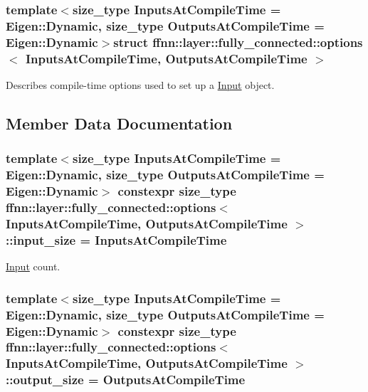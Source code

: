 \subsubsection*{template$<$size\-\_\-type Inputs\-At\-Compile\-Time = Eigen\-::\-Dynamic, size\-\_\-type Outputs\-At\-Compile\-Time = Eigen\-::\-Dynamic$>$struct ffnn\-::layer\-::fully\-\_\-connected\-::options$<$ Inputs\-At\-Compile\-Time, Outputs\-At\-Compile\-Time $>$}

Describes compile-\/time options used to set up a \hyperlink{classffnn_1_1layer_1_1_input}{Input} object. 

\subsection{Member Data Documentation}
\hypertarget{structffnn_1_1layer_1_1fully__connected_1_1options_ae136ed9ebf9016f397acc9f3c10c9a32}{
\subsubsection[{input\-\_\-size}]{\setlength{\rightskip}{0pt plus 5cm}template$<$size\-\_\-type Inputs\-At\-Compile\-Time = Eigen\-::\-Dynamic, size\-\_\-type Outputs\-At\-Compile\-Time = Eigen\-::\-Dynamic$>$ constexpr {\bf size\-\_\-type} {\bf ffnn\-::layer\-::fully\-\_\-connected\-::options}$<$ Inputs\-At\-Compile\-Time, Outputs\-At\-Compile\-Time $>$\-::input\-\_\-size = Inputs\-At\-Compile\-Time\hspace{0.3cm}{\ttfamily [static]}}}\label{structffnn_1_1layer_1_1fully__connected_1_1options_ae136ed9ebf9016f397acc9f3c10c9a32}


\hyperlink{classffnn_1_1layer_1_1_input}{Input} count. 

\hypertarget{structffnn_1_1layer_1_1fully__connected_1_1options_a7b40e94c99dc865af66d8f2ee5a8c4cc}{
\subsubsection[{output\-\_\-size}]{\setlength{\rightskip}{0pt plus 5cm}template$<$size\-\_\-type Inputs\-At\-Compile\-Time = Eigen\-::\-Dynamic, size\-\_\-type Outputs\-At\-Compile\-Time = Eigen\-::\-Dynamic$>$ constexpr {\bf size\-\_\-type} {\bf ffnn\-::layer\-::fully\-\_\-connected\-::options}$<$ Inputs\-At\-Compile\-Time, Outputs\-At\-Compile\-Time $>$\-::output\-\_\-size = Outputs\-At\-Compile\-Time\hspace{0.3cm}{\ttfamily [static]}}}\label{structffnn_1_1layer_1_1fully__connected_1_1options_a7b40e94c99dc865af66d8f2ee5a8c4cc}


